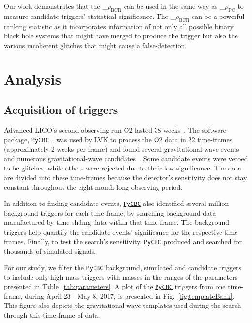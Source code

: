 \documentclass[%
 nofootinbib,
 amsmath,amssymb,
 aps,
 twocolumn,
 superscriptaddress
]{revtex4-2}
\newcommand{\pycbc}{{\sc \href{https://pycbc.org/}{\texttt{PyCBC}}}\xspace}
\newcommand{\mathcmd}[1]{{\sc \relax\ifmmode#1\else $#1$\fi}\xspace}
\newcommand{\bcr}{\mathcmd{\rho_\text{BCR}}}
\newcommand{\pycbcstat}{\mathcmd{\rho_\text{PC}}}
\begin{document}
Our work demonstrates that the \bcr can be used in the same way as \pycbcstat to measure candidate triggers' statistical significance.  The \bcr can be a powerful ranking statistic as it incorporates information of not only all possible binary black hole systems that might have merged to produce the trigger but also the various incoherent glitches that might cause a false-detection. 

\section{Analysis}\label{sec:Analysis}

\subsection{Acquisition of triggers}
Advanced LIGO's second observing run O2 lasted $38$ weeks~\cite{GWOSC}. The software package, \pycbc~\cite{pycbc_code}, was used by LVK to process the O2 data in 22 time-frames (approximately 2 weeks per frame) and found several gravitational-wave events and numerous gravitational-wave candidates~\cite{pycbc_og0, pycbc_og1, pycbc_og2, pycbc_og3, pycbc_og4, pycbc_og5, pycbc_og6}. Some candidate events were vetoed to be glitches, while others were rejected due to their low significance. The data are divided into these time-frames because the detector's sensitivity does not stay constant throughout the eight-month-long observing period.

In addition to finding candidate events, \pycbc also identified several million background triggers for each time-frame, by searching background data manufactured by time-sliding data within that time-frame. The background triggers help quantify the candidate events' significance for the respective time-frames. Finally, to test the search's sensitivity, \pycbc produced and searched for thousands of simulated signals. 

For our study, we filter the \pycbc background, simulated and candidate triggers to include only high-mass triggers with masses in the ranges of the parameters presented in Table~\ref{tab:parameters}. A plot of the \pycbc triggers from one time-frame, during April 23 - May 8, 2017, is presented in Fig.~\ref{fig:templateBank}. This figure also depicts the gravitational-wave templates used during the search through this time-frame of data. 
\end{document}
